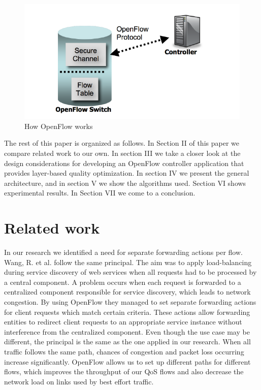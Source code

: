 \documentclass[conference]{IEEEtran}
\begin{document}
\begin{figure}[htb]
\centering
\includegraphics[scale=0.6]{fig/openflow1}
\caption{How OpenFlow works}
\label{fig:openflow1}
\end{figure}

The rest of this paper is organized as follows.
In Section II of this paper we compare related work to our own. 
In section III we take a closer look at the design considerations for 
developing an OpenFlow controller application that provides layer-based quality optimization. 
In section IV we present the general architecture, and in section V we show the algorithms used. 
Section VI shows experimental results.
In Section VII we come to a conclusion.

\section{Related work}
In our research we identified a need for separate forwarding actions per flow.
Wang, R. et al. \cite{wang2011openflow} follow the same principal.
The aim was to apply load-balancing during service discovery of web services 
when all requests had to be processed by a central component.
A problem occurs when each request is forwarded to a centralized component responsible 
for service discovery, which leads to network congestion. 
By using OpenFlow they managed to set separate forwarding actions for client requests which match 
certain criteria. These actions allow forwarding entities to redirect client requests to an 
appropriate service instance without interference from the centralized component. Even though 
the use case may be different, the principal is the same as the one applied in our research. 
When all traffic follows the same path, chances of congestion and packet loss 
occurring increase significantly. OpenFlow allows us to set up different paths for different flows, which 
improves the throughput of our QoS flows and also decrease the network load on links used by best 
effort traffic.\\
\end{document}
